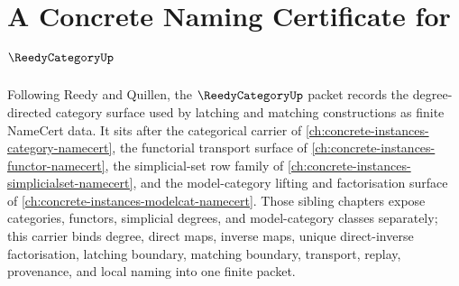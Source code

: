 \chapter{A Concrete Naming Certificate for $\ReedyCategoryUp$}
\label{ch:concrete-instances-reedy-category-namecert}

Following Reedy and Quillen, the $\ReedyCategoryUp$ packet records the degree-directed category surface used by latching and matching constructions as finite NameCert data. It sits after the categorical carrier of \autoref{ch:concrete-instances-category-namecert}, the functorial transport surface of \autoref{ch:concrete-instances-functor-namecert}, the simplicial-set row family of \autoref{ch:concrete-instances-simplicialset-namecert}, and the model-category lifting and factorisation surface of \autoref{ch:concrete-instances-modelcat-namecert}. Those sibling chapters expose categories, functors, simplicial degrees, and model-category classes separately; this carrier binds degree, direct maps, inverse maps, unique direct-inverse factorisation, latching boundary, matching boundary, transport, replay, provenance, and local naming into one finite packet.

